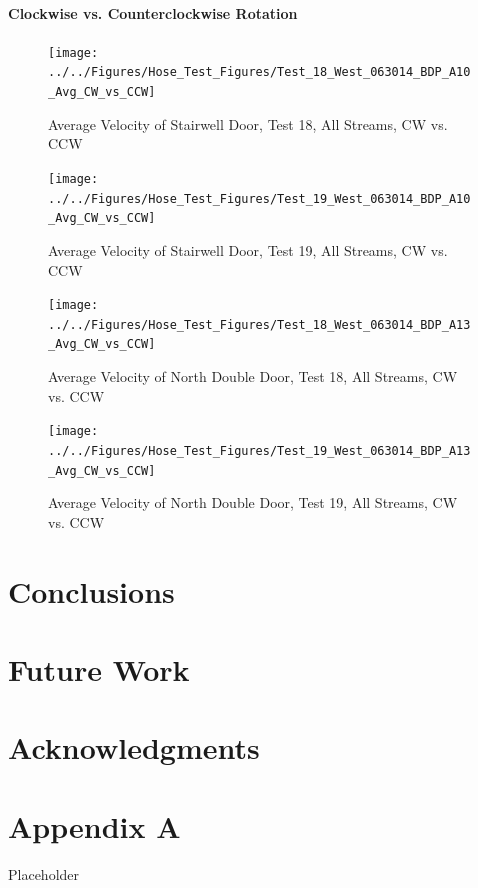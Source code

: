 \documentclass[12pt,oneside]{book}
\begin{document}
\clearpage

\subsubsection{Clockwise vs. Counterclockwise Rotation}

\begin{figure}[!ht]
\texttt{[image: ../../Figures/Hose\_Test\_Figures/Test\_18\_West\_063014\_BDP\_A10\_Avg\_CW\_vs\_CCW]}
\caption{Average Velocity of Stairwell Door, Test 18, All Streams, CW vs. CCW}
\label{fig:Test_18_BDP_A10_Avg_CW_vs_CCW}
\end{figure}

\begin{figure}[!ht]
\texttt{[image: ../../Figures/Hose\_Test\_Figures/Test\_19\_West\_063014\_BDP\_A10\_Avg\_CW\_vs\_CCW]}
\caption{Average Velocity of Stairwell Door, Test 19, All Streams, CW vs. CCW}
\label{fig:Test_19_BDP_A10_Avg_CW_vs_CCW}
\end{figure}

\clearpage

\begin{figure}[!ht]
\texttt{[image: ../../Figures/Hose\_Test\_Figures/Test\_18\_West\_063014\_BDP\_A13\_Avg\_CW\_vs\_CCW]}
\caption{Average Velocity of North Double Door, Test 18, All Streams, CW vs. CCW}
\label{fig:Test_18_BDP_A13_Avg_CW_vs_CCW}
\end{figure}

\clearpage

\begin{figure}[!ht]
\texttt{[image: ../../Figures/Hose\_Test\_Figures/Test\_19\_West\_063014\_BDP\_A13\_Avg\_CW\_vs\_CCW]}
\caption{Average Velocity of North Double Door, Test 19, All Streams, CW vs. CCW}
\label{fig:Test_19_BDP_A13_Avg_CW_vs_CCW}
\end{figure}

\clearpage

\chapter{Conclusions}
\label{chap:Conclusions}

\chapter{Future Work}
\label{chap:Future_Work}

\chapter{Acknowledgments}
\label{chap:Acknowledgments}



\appendix

\chapter{Appendix A}

Placeholder
\end{document}
